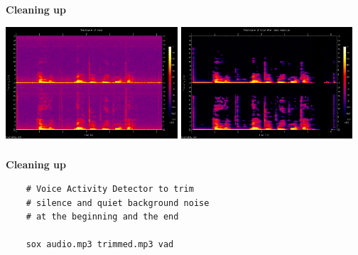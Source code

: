 \documentclass[usenames,dvipsnames, 18pt, compress, aspectratio=169]{beamer}
\begin{document}
\begin{frame}[fragile]{}
    \frametitle{}
    \begin{center}
        \textbf{Cleaning up}
        \vspace{0.2cm}

        \includegraphics[width=0.48\textwidth]{voice-spectrogram.png}
        \hfill
        \includegraphics[width=0.48\textwidth]{voice-clean-spectrogram.png}

    \end{center}
\end{frame}

\begin{frame}[fragile]{}
    \frametitle{}
    \begin{center}
        \textbf{Cleaning up}
        \vspace{0.2cm}

        \begin{verbatim}
    # Voice Activity Detector to trim
    # silence and quiet background noise
    # at the beginning and the end

    sox audio.mp3 trimmed.mp3 vad

        \end{verbatim}

    \end{center}
\end{frame}
\end{document}
